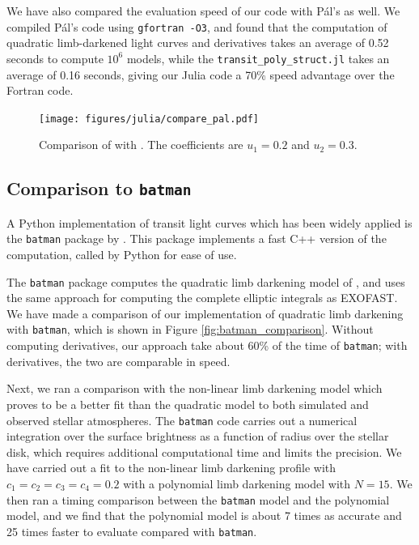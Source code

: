 \documentclass[modern]{aastex61}
\begin{document}
We have also compared the evaluation speed of our code with P\'al's as well.
We compiled P\'al's code using \texttt{gfortran -O3}, and found that
the computation of quadratic limb-darkened light curves and
derivatives takes an average of 0.52 seconds to compute $10^6$ models,
while the \texttt{transit\_poly\_struct.jl} takes an average of 0.16 seconds,
giving our Julia code a 70\% speed advantage over the Fortran code.

\begin{figure}
    \begin{centering}
    \texttt{[image: figures/julia/compare\_pal.pdf]}
    \caption{Comparison of \citet{Pal2008} with \thiswork.  The
    coefficients are $u_1=0.2$ and $u_2=0.3$. 
    \label{fig:Pal_comparison}}
    \end{centering}
\end{figure}

\subsection{Comparison to \texttt{batman}}

A Python implementation of transit light curves which has been widely applied
is the \texttt{batman} package by \citet{Kreidberg2015}.  This package
implements a fast C++ version of the computation, called by Python for
ease of use.

The \texttt{batman} package computes the quadratic limb darkening model
of \citet{MandelAgol2002}, and uses the same approach for computing
the complete elliptic integrals as EXOFAST.  We have made a comparison
of our implementation of quadratic limb darkening with \texttt{batman},
which is shown in Figure \ref{fig:batman_comparison}.  Without computing
derivatives, our approach take about 60\% of the time of \texttt{batman};
with derivatives, the two are comparable in speed.

Next, we ran a comparison with the non-linear limb darkening model which
proves to be a better fit than the quadratic model to both simulated
and observed stellar atmospheres.  The \texttt{batman} code carries out
a numerical integration over the surface brightness as a function of
radius over the stellar disk, which requires additional computational
time and limits the precision.  We have carried out a fit to the
non-linear limb darkening profile with $c_1=c_2=c_3=c_4=0.2$ with a
polynomial limb darkening model with $N=15$.  We then ran a timing
comparison between the \texttt{batman} model and the polynomial
model, and we find that the polynomial model is about 7 times
as accurate and 25 times faster to evaluate compared with \texttt{batman}.
\end{document}
